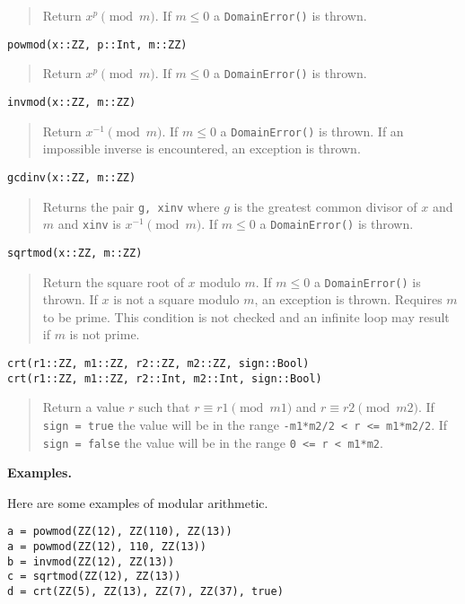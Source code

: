 \documentclass[a4paper,10pt]{article}
\newcommand{\code}{\lstinline}
\newcommand{\desc}[1]{\vspace{-3mm}\begin{quote}#1\end{quote}}
\begin{document}
{{{\desc{Return $x^p \pmod{m}$. If $m \leq 0$ a \code{DomainError()} is thrown.}

\begin{lstlisting}
powmod(x::ZZ, p::Int, m::ZZ)
\end{lstlisting}

\desc{Return $x^p \pmod{m}$. If $m \leq 0$ a \code{DomainError()} is thrown.}

\begin{lstlisting}
invmod(x::ZZ, m::ZZ)
\end{lstlisting}

\desc{Return $x^{-1} \pmod{m}$. If $m \leq 0$ a \code{DomainError()} is thrown. If
an impossible inverse is encountered, an exception is thrown.}

\begin{lstlisting}
gcdinv(x::ZZ, m::ZZ)
\end{lstlisting}

\desc{Returns the pair \code{g, xinv} where $g$ is the greatest common divisor of
$x$ and $m$ and \code{xinv} is $x^{-1} \pmod{m}$. If $m \leq 0$ a 
\code{DomainError()} is thrown.}

\begin{lstlisting}
sqrtmod(x::ZZ, m::ZZ)
\end{lstlisting}

\desc{Return the square root of $x$ modulo $m$. If $m \leq 0$ a \code{DomainError()}
is thrown. If $x$ is not a square modulo $m$, an exception is thrown. Requires $m$ to
be prime. This condition is not checked and an infinite loop may result if $m$ is
not prime.}

\begin{lstlisting}
crt(r1::ZZ, m1::ZZ, r2::ZZ, m2::ZZ, sign::Bool)
crt(r1::ZZ, m1::ZZ, r2::Int, m2::Int, sign::Bool)
\end{lstlisting}

\desc{Return a value $r$ such that $r \equiv r1 \pmod {m1}$ and $r \equiv r2 \pmod{m2}$.
If \code{sign = true} the value will be in the range \code{-m1*m2/2 < r <= m1*m2/2}. If
\code{sign = false} the value will be in the range \code{0 <= r < m1*m2}.}

\textbf{Examples.}

Here are some examples of modular arithmetic.

\begin{lstlisting}
a = powmod(ZZ(12), ZZ(110), ZZ(13))
a = powmod(ZZ(12), 110, ZZ(13))
b = invmod(ZZ(12), ZZ(13))
c = sqrtmod(ZZ(12), ZZ(13))
d = crt(ZZ(5), ZZ(13), ZZ(7), ZZ(37), true)
\end{lstlisting}

}}}
\end{document}
